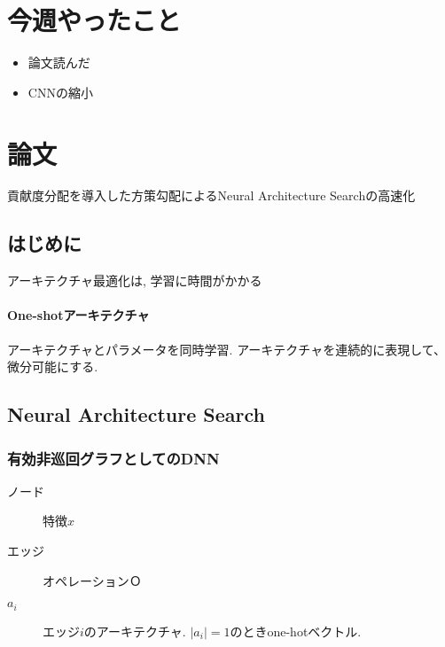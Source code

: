 \documentclass[twocolumn]{jarticle}     %
\begin{document}


\section{今週やったこと}
\begin{itemize}
	\item {論文読んだ}
	\item {CNNの縮小}
\end{itemize}

\section{論文}
貢献度分配を導入した方策勾配によるNeural Architecture Searchの高速化

\subsection{はじめに}
アーキテクチャ最適化は, 学習に時間がかかる
\paragraph{One-shotアーキテクチャ}
アーキテクチャとパラメータを同時学習.
アーキテクチャを連続的に表現して、微分可能にする.

\subsection{Neural Architecture Search}
\subsubsection{有効非巡回グラフとしてのDNN}
\begin{description}
  \item[ノード] 特徴$x$
  \item[エッジ] オペレーション$Ｏ$
  \item[$a_i$] エッジ$i$のアーキテクチャ. $|a_i|=1$のときone-hotベクトル.
\end{description}
\end{document}
